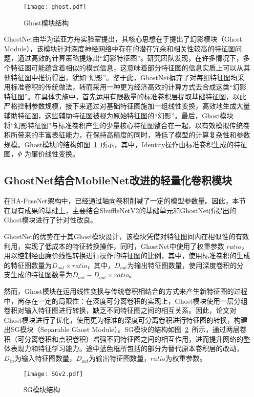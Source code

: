 \begin{figure}
    \centering
    \texttt{[image: ghost.pdf]}
    \caption{Ghost模块结构\cite{han2020ghostnet}}
    \label{fig:ghost}
\end{figure}
GhostNet\cite{han2020ghostnet}由华为诺亚方舟实验室提出，其核心思想在于提出了幻影模块（Ghost Module），该模块针对深度神经网络中存在的潜在冗余和相关性较高的特征图问题，通过高效的计算策略提炼出“幻影特征图”。研究团队发现，在许多情况下，多个特征图可能蕴含着相似的模式信息，这意味着部分特征图的信息实质上可以从其他特征图中推衍得出，犹如“幻影”。鉴于此，GhostNet摒弃了对每组特征图均采用标准卷积的传统做法，转而采用一种更为经济高效的计算方式去合成这类“幻影特征图”。在具体实施中，首先运用有限数量的标准卷积层提取基础特征图，以此严格控制参数规模，接下来通过对基础特征图施加一组线性变换，高效地生成大量辅助特征图，这些辅助特征图被视为原始特征图的“幻影”。最后，Ghost模块将“幻影特征图”与标准卷积产生的少量核心特征图整合在一起，以有效模拟传统卷积所带来的丰富表征能力，在保持高精度的同时，降低了模型的计算复杂性和参数规模。Ghost模块的结构如图~\ref{fig:ghost}~所示，其中，Identity操作由标准卷积生成的特征图，\(\Phi\) 为廉价线性变换。

\subsection{GhostNet结合MobileNet改进的轻量化卷积模块}

在HA-FuseNet架构中，已经通过轴向卷积削减了一定的模型参数量。因此，本节在现有成果的基础上，主要结合ShuffleNetV2的基础单元和GhostNet所提出的Ghost模块进行了针对性改良。

GhostNet的优势在于其Ghost模块设计，该模块凭借对特征图间内在相似性的有效利用，实现了低成本的特征转换操作，同时，GhostNet中使用了权重参数 \(ratio\)，用以控制经由廉价线性转换进行操作的特征图的比例，其中，使用标准卷积的生成的特征图数量为\(D_{out} \times ratio\)，其中，\(D_{out}\)为输出特征图数量，使用深度卷积的分支生成的特征图数量为\(D_{out}-D_{out} \times ratio\)。

然而，Ghost模块在运用线性变换与传统卷积相结合的方式来产生新特征图的过程中，尚存在一定的局限性：在深度可分离卷积的实现上，Ghost模块使用一层分组卷积对输入特征图进行转换，缺乏不同特征图之间的相互关系。因此，论文对Ghost模块进行了优化，使用更为标准的深度可分离卷积进行特征图的转换，构建出SG模块（Separable Ghost Module）。SG模块的结构如图~\ref{fig:sg}~所示，通过两层卷积（可分离卷积和点积卷积）增强不同特征图之间的相互作用，进而提升网络的整体表现力和特征学习能力。途中蓝色框所包括的部分为替代原本卷积层的改动，\(D_{in}\)为输入特征图数量，\(D_{out}\)为输出特征图数量，\(ratio\)为权重参数。
\begin{figure}
    \centering
    \texttt{[image: SGv2.pdf]}
    \caption{SG模块结构}
    \label{fig:sg}
\end{figure}

